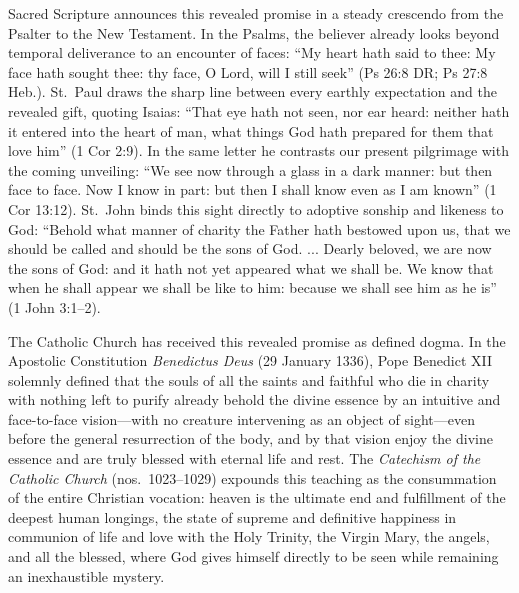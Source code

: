 Sacred Scripture announces this revealed promise in a steady crescendo from the Psalter to the New Testament. In the Psalms, the believer already looks beyond temporal deliverance to an encounter of faces: ``My heart hath said to thee: My face hath sought thee: thy face, O Lord, will I still seek'' (Ps 26:8 DR; Ps 27:8 Heb.). St.\ Paul draws the sharp line between every earthly expectation and the revealed gift, quoting Isaias: ``That eye hath not seen, nor ear heard: neither hath it entered into the heart of man, what things God hath prepared for them that love him'' (1 Cor 2:9). In the same letter he contrasts our present pilgrimage with the coming unveiling: ``We see now through a glass in a dark manner: but then face to face. Now I know in part: but then I shall know even as I am known'' (1 Cor 13:12). St.\ John binds this sight directly to adoptive sonship and likeness to God: ``Behold what manner of charity the Father hath bestowed upon us, that we should be called and should be the sons of God. ... Dearly beloved, we are now the sons of God: and it hath not yet appeared what we shall be. We know that when he shall appear we shall be like to him: because we shall see him as he is'' (1 John 3:1--2).

The Catholic Church has received this revealed promise as defined dogma. In the Apostolic Constitution \emph{Benedictus Deus} (29 January 1336), Pope Benedict XII solemnly defined that the souls of all the saints and faithful who die in charity with nothing left to purify already behold the divine essence by an intuitive and face-to-face vision---with no creature intervening as an object of sight---even before the general resurrection of the body, and by that vision enjoy the divine essence and are truly blessed with eternal life and rest. The \emph{Catechism of the Catholic Church} (nos.\ 1023--1029) expounds this teaching as the consummation of the entire Christian vocation: heaven is the ultimate end and fulfillment of the deepest human longings, the state of supreme and definitive happiness in communion of life and love with the Holy Trinity, the Virgin Mary, the angels, and all the blessed, where God gives himself directly to be seen while remaining an inexhaustible mystery.

